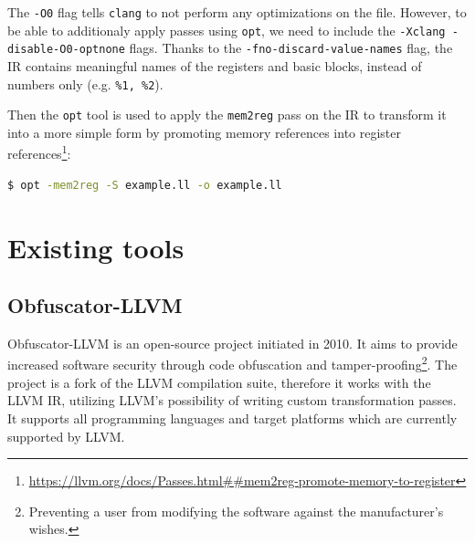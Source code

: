 \documentclass[
  digital, %
  notable,   %
  twoside, %
  nolof,     %
  nolot,     %
]{fithesis3}
\theoremstyle{definition}
\begin{document}
The \texttt{-O0} flag tells \texttt{clang} to not perform any optimizations on the file. However, to be able to additionaly apply passes using \texttt{opt}, we need to include the \texttt{-Xclang -disable-O0-optnone} flags. Thanks to the \texttt{-fno-discard-value-names} flag, the IR contains meaningful names of the registers and basic blocks, instead of numbers only (e.g. \texttt{\%1, \%2}).

Then the \texttt{opt} tool is used to apply the \texttt{mem2reg} pass on the IR to transform it into a more simple form by promoting memory references into register references\footnote{\url{https://llvm.org/docs/Passes.html##mem2reg-promote-memory-to-register}}:

\begin{lstlisting}[language=bash]
$ opt -mem2reg -S example.ll -o example.ll
\end{lstlisting}

\chapter{Existing tools} \label{chap:tools}

\section{Obfuscator-LLVM} \label{sec:ollvm}

Obfuscator-LLVM is an open-source project initiated in 2010. It aims to provide increased software security through code obfuscation and tamper-proofing\footnote{Preventing a user from modifying the software against the manufacturer's wishes.}. The project is a fork of the LLVM compilation suite, therefore it works with the LLVM IR, utilizing LLVM's possibility of writing custom transformation passes. It supports all programming languages and target platforms which are currently supported by LLVM. 
\end{document}
